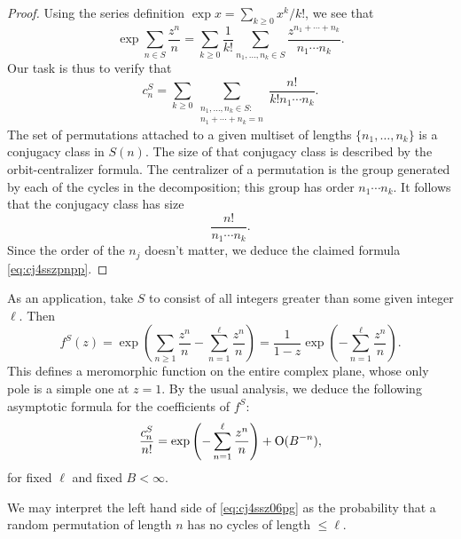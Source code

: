 \documentclass[reqno]{amsart}  \numberwithin{theorem}{section} \numberwithin{equation}{section}
\begin{document}
\begin{proof}
  Using the series definition $\exp x = \sum_{k \geq 0} x^k / k!$, we see that
  \begin{equation*}
    \exp \sum_{n \in S} \frac{z^n}{n}
    = \sum_{k \geq 0}
    \frac{1}{k!}
    \sum_{n_1, \dotsc, n_k \in S}
    \frac{z^{n _1 + \dotsb + n_k}}{n_1 \dotsb n_k}.
  \end{equation*}
  Our task is thus to verify that
  \begin{equation}\label{eq:cj4sszpnpp}
    c_n^S = \sum_{k \geq 0}
    \sum_{
      \substack{
        n_1, \dotsc, n_k \in S : \\
        n_1 + \dotsb + n_k = n
      }
    }
    \frac{n!}{k ! n_1 \dotsb n_k}.
  \end{equation}
  The set of permutations attached to a given multiset of lengths $\{n_1, \dotsc, n_k\}$ is a conjugacy class in $S(n)$.  The size of that conjugacy class is described by the orbit-centralizer formula.  The centralizer of a permutation is the group generated by each of the cycles in the decomposition; this group has order $n_1 \dotsb n_k$.  It follows that the conjugacy class has size
  \begin{equation*}
    \frac{n!}{n_1 \dotsb n_k}.
  \end{equation*}
  Since the order of the $n_j$ doesn't matter, we deduce the claimed formula \eqref{eq:cj4sszpnpp}.
\end{proof}

As an application, take $S$ to consist of all integers greater than some given integer $\ell$.  Then
\begin{equation*}
  f^S(z) = \exp \left(  \sum_{n \geq 1} \frac{z^n}{ n } - \sum_{n = 1}^{\ell} \frac{z^n }{n}\right)
  =
  \frac{1}{1 - z} \exp \left( - \sum_{n = 1}^{\ell} \frac{z^n }{n} \right).
\end{equation*}
This defines a meromorphic function on the entire complex plane, whose only pole is a simple one at $z = 1$.  By the usual analysis, we deduce the following asymptotic formula for the coefficients of $f^S$:
\begin{equation}\label{eq:cj4ssz06pg}
  \frac{c_n^S}{n!} = \exp \left( - \sum_{n = 1 }^{\ell} \frac{z^n }{n} \right) + \operatorname{O}(B^{-n}),
\end{equation}
for fixed $\ell$ and fixed $B < \infty$.

We may interpret the left hand side of \eqref{eq:cj4ssz06pg} as the probability that a random permutation of length $n$ has no cycles of length $\leq \ell$.
\end{document}
